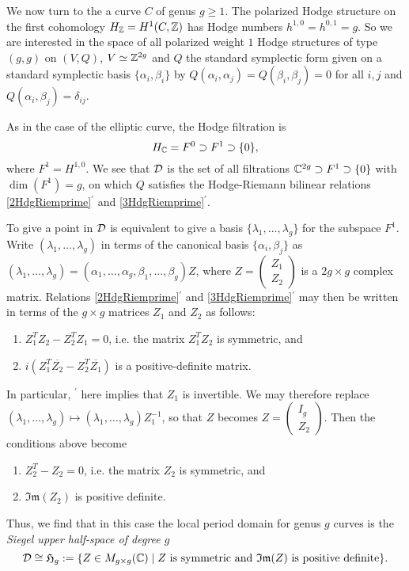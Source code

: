 \documentclass[../main.tex]{subfiles}
\begin{document}
\begin{es} 
We now turn to the a curve $C$ of genus $g \geq 1$. The polarized Hodge structure on the first cohomology $H_{\mathbb{Z}} = H^1(C,\mathbb{Z})$ has Hodge numbers $h^{1,0} = h^{0,1} = g$. 
So we are interested in the space of all polarized weight $1$ Hodge structures of type $(g, g)$ on $(V, Q)$, $V \simeq \mathbb{Z}^{2g}$ and $Q$ the standard symplectic form given on a standard symplectic basis $\{ \alpha_i, \beta_i \}$ by  $Q(\alpha_i,\alpha_j) = Q(\beta_i,\beta_j) = 0$ for all $i,j$ and $Q(\alpha_i,\beta_j) = \delta_{ij}$.

As in the case of the elliptic curve, the Hodge filtration is
\[ H_{\mathbb{C}} = F^0 \supset F^1 \supset \{0\},\]
where $F^1 = H^{1,0}$. We see that $\mathcal{D}$ is the set of all filtrations $\mathbb{C}^{2g} \supset F^1 \supset \{0\}$ with $\dim(F^1) = g$, on which $Q$ satisfies the Hodge-Riemann bilinear relations \eqref{2HdgRiemprime}$^\prime$ and \eqref{3HdgRiemprime}$^\prime$.

To give a point in $\mathcal{D}$ is equivalent to give a basis $\{\lambda_1,\ldots,\lambda_g\}$ for the subspace $F^1$. Write $(\lambda_1,\ldots,\lambda_g)$ in terms of the canonical basis $\{\alpha_i,\beta_j\}$ as $(\lambda_1,\ldots,\lambda_g) = (\alpha_1,\ldots,\alpha_g,\beta_1,\ldots,\beta_g)Z$, where $Z = \left(\begin{array}{c} Z_1 \\ Z_2 \end{array} \right)$ is a $2g \times g$ complex matrix. Relations \eqref{2HdgRiemprime}$^\prime$ and \eqref{3HdgRiemprime}$^\prime$ may then be written in terms of the $g \times g$ matrices $Z_1$ and $Z_2$ as follows:
\begin{enumerate}[(1')]\addtocounter{enumi}{1}\setlength{\itemindent}{\parindent}
\item \label{new2primehere} $Z_1^TZ_2 - Z_2^TZ_1 = 0$, i.e. the matrix $Z_1^TZ_2$ is symmetric, and
\item \label{new3primehere} $i (Z_1^T\overline{Z_2} - Z_2^T\overline{Z_1} )$ is a positive-definite matrix.
\end{enumerate}

In particular, \label{new3primehere}$^\prime$ here implies that $Z_1$ is invertible. We may therefore replace $(\lambda_1,\ldots,\lambda_g) \mapsto (\lambda_1,\ldots,\lambda_g)Z_1^{-1}$, so that $Z$ becomes $Z = \left(\begin{array}{c} I_g \\ Z_2 \end{array} \right)$. Then the conditions above become
\begin{enumerate}[(1')]\addtocounter{enumi}{1}\setlength{\itemindent}{\parindent}
\item $Z_2^T - Z_2 = 0$, i.e. the matrix $Z_2$ is symmetric, and
\item $\mathfrak{Im} (Z_2)$ is positive definite.
\end{enumerate}
Thus, we find that in this case the local period domain for genus $g$ curves is the \emph{Siegel upper half-space of degree $g$}
\[\calD \cong \mathfrak{H}_g := \{Z \in M_{g\times g}(\C) \mid Z\ \mathrm{is}\ \mathrm{symmetric}\ \mathrm{and}\ \mathfrak{Im}(Z)\ \mathrm{is}\ \mathrm{positive}\ \mathrm{definite}\}.\]


\end{es}
\end{document}
